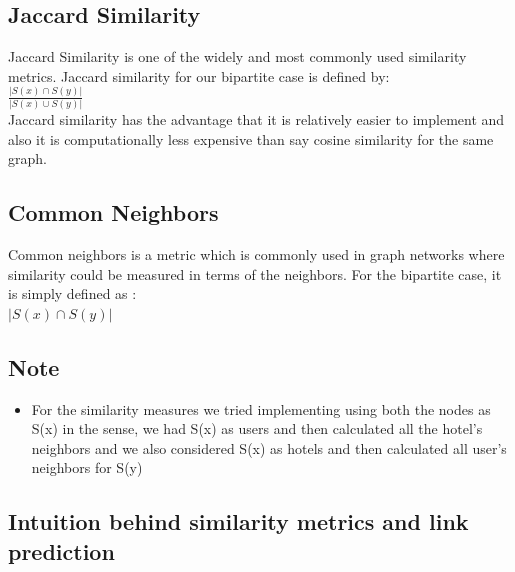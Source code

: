 \documentclass[letterpaper,twocolumn,11pt]{article}
\begin{document}
\subsection{Jaccard Similarity}

Jaccard Similarity is one of the widely and most commonly used similarity metrics. Jaccard similarity for our bipartite case is defined by:\\
$\frac {| S(x) \cap S(y) |}{| S(x) \cup S(y) |}$ \\

Jaccard similarity has the advantage that it is relatively easier to implement and also it is computationally less expensive than say cosine similarity for the same graph.

\subsection{Common Neighbors}
Common neighbors is a metric which is commonly used in graph networks where similarity could be measured in terms of the neighbors. For the bipartite case, it is simply defined as :\\
$|S(x) \cap S(y)|$


\subsection{Note}
 \begin{itemize}
 \item For the similarity measures we tried implementing using both the nodes as S(x) in the sense, we had S(x) as users and then calculated all the hotel's neighbors and we also considered S(x) as hotels and then calculated all user's neighbors for S(y)
 \end{itemize}

\subsection{Intuition behind similarity metrics and link prediction}
\end{document}
